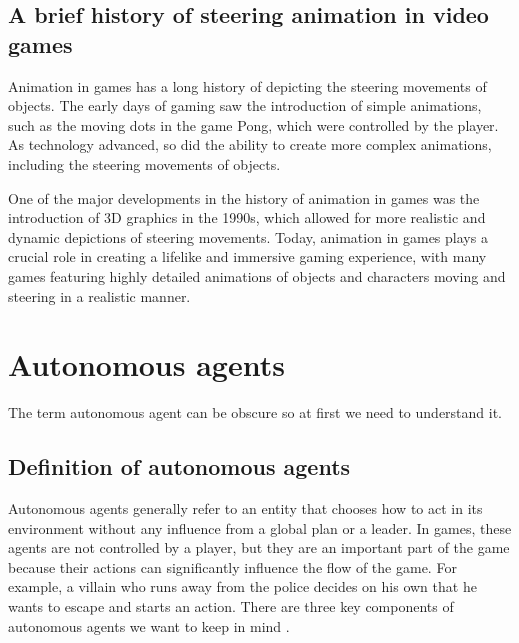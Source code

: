 \documentclass[10pt,twoside,english,a4paper]{article}
\begin{document}
\subsection{A brief history of steering animation in video games} \label{history}
Animation in games has a long history of depicting the steering movements of 
objects. The early days of gaming saw the introduction of simple animations, 
such as the moving dots in the game Pong, which were controlled by the player. 
As technology advanced, so did the ability to create more complex animations, 
including the steering movements of objects. 

One of the major developments in 
the history of animation in games was the introduction of 3D graphics in the 
1990s, which allowed for more realistic and dynamic depictions of steering 
movements. Today, animation in games plays a crucial role in creating a lifelike 
and immersive gaming experience, with many games featuring highly detailed 
animations of objects and characters moving and steering in a realistic manner.

\section{Autonomous agents} \label{autonomous agents} 

The term autonomous agent can be obscure so at first we need to 
understand it.

\subsection{Definition of autonomous agents} \label{definition of a.a.}

Autonomous agents generally refer to an entity that chooses 
how to act in its environment without any influence from a global 
plan or a leader. In games, these agents are not controlled by a 
player, but they are an important part of the game because their actions
can significantly influence the flow of the game. For example, 
a villain who runs away from the police decides on his own that he
wants to escape and starts an action. There are three key 
components of autonomous agents we want to keep in mind 
\cite{Verhagen}. 
\end{document}
